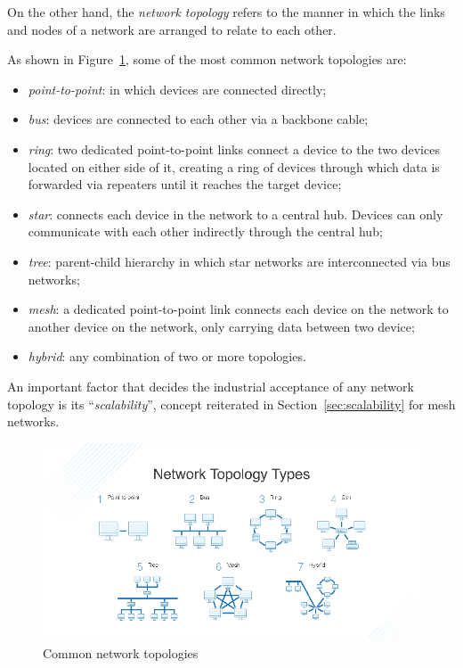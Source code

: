 		On the other hand, the \textit{network topology} refers to the manner in which the links and nodes of a network are arranged to relate to each other.
		
		As shown in Figure~\ref{img:network_topologies}, some of the most common network topologies are:
		\begin{itemize}
			\item \textit{point-to-point}: in which devices are connected directly;
			\item \textit{bus}: devices are connected to each other via a backbone cable;
			\item \textit{ring}: two dedicated point-to-point links connect a device to the two devices located on either side of it, creating a ring of devices through which data is forwarded via repeaters until it reaches the target device;
			\item \textit{star}: connects each device in the network to a central hub. Devices can only communicate with each other indirectly through the central hub;
			\item \textit{tree}: parent-child hierarchy in which star networks are interconnected via bus networks;
			\item \textit{mesh}: a dedicated point-to-point link connects each device on the network to another device on the network, only carrying data between two device;
			\item \textit{hybrid}: any combination of two or more topologies.
		\end{itemize}
	
		An important factor that decides the industrial acceptance of any network topology is its ``\textit{scalability}'', concept reiterated in Section~\ref{sec:scalability} for mesh networks.
	
		\begin{figure}[h]
			\centering
			\includegraphics[width=\textwidth]{resources/img/chap3/network_topologies}
			\caption{Common network topologies}
			\label{img:network_topologies}
		\end{figure}
	
